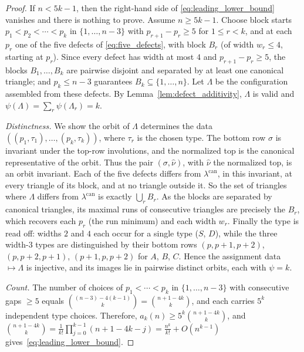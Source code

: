 \documentclass[pdftex]{sigma}
\numberwithin{equation}{section}
\theoremstyle{definition}
\begin{document}
\begin{proof}
	If $n<5k-1$, then the right-hand side of \eqref{eq:leading_lower_bound}
	vanishes and there is nothing to prove. Assume $n\ge 5k-1$.
	Choose block starts $p_1<p_2<\cdots<p_k$ in $\{1,\dots,n-3\}$ with
	$p_{r+1}-p_r\ge 5$ for $1\le r<k$, and at each $p_r$ one of the five defects
	of \eqref{eq:five_defects}, with block $B_r$ (of width $w_r\le 4$, starting
	at $p_r$). Since every defect has width at most $4$ and $p_{r+1}-p_r\ge5$,
	the blocks $B_1,\dots,B_k$ are pairwise disjoint and separated by at least one
	canonical triangle; and $p_k\le n-3$ guarantees $B_k\subseteq\{1,\dots,n\}$.
	Let $\Lambda$ be the configuration assembled from these defects. By
	Lemma~\ref{lem:defect_additivity}, $\Lambda$ is valid and
	$\psi(\Lambda)=\sum_{r}\psi(\Lambda_r)=k$.

	\emph{Distinctness.} We show the orbit of $\Lambda$ determines the data
	$((p_1,\tau_1),\dots,(p_k,\tau_k))$, where $\tau_r$ is the chosen
	type. The bottom row $\sigma$ is invariant under the top-row involutions, and
	the normalized top is the canonical representative of the orbit. Thus the pair
	$ (\sigma,\widehat{\nu} )$, with $\widehat\nu$ the normalized top, is
	an orbit invariant. Each of the five defects differs from
	$\lambda^{\mathrm{can}}$, in this invariant, at every triangle of its block,
	and at no triangle outside it. So the set of triangles where $\Lambda$ differs
	from $\lambda^{\mathrm{can}}$ is exactly $\bigcup_r B_r$. As the blocks are
	separated by canonical triangles, its maximal runs of consecutive triangles
	are precisely the $B_r$, which recovers each $p_r$ (the run minimum) and each
	width $w_r$. Finally the type is read off: widths $2$ and $4$ each occur for a
	single type ($S$, $D$), while the three width-$3$ types are distinguished by
	their bottom rows $(p,p{+}1,p{+}2)$, $(p,p{+}2,p{+}1)$, $(p{+}1,p,p{+}2)$ for
	$A$, $B$, $C$. Hence the assignment data $\mapsto\Lambda$ is injective, and its
	images lie in pairwise distinct orbits, each with $\psi=k$.

	\emph{Count.} The number of choices of $p_1<\cdots<p_k$ in $\{1,\dots,n-3\}$
	with consecutive gaps $\ge5$ equals $\binom{(n-3)-4(k-1)}{k}=\binom{n+1-4k}{k}$,
	and each carries $5^k$ independent type choices. Therefore,
	$a_k(n)\ge 5^k\binom{n+1-4k}{k}$, and
	$\binom{n+1-4k}{k}=\frac{1}{k!}\prod_{j=0}^{k-1}(n+1-4k-j)=\frac{n^k}{k!}+O(n^{k-1})$
	gives~\eqref{eq:leading_lower_bound}.
\end{proof}
\end{document}
